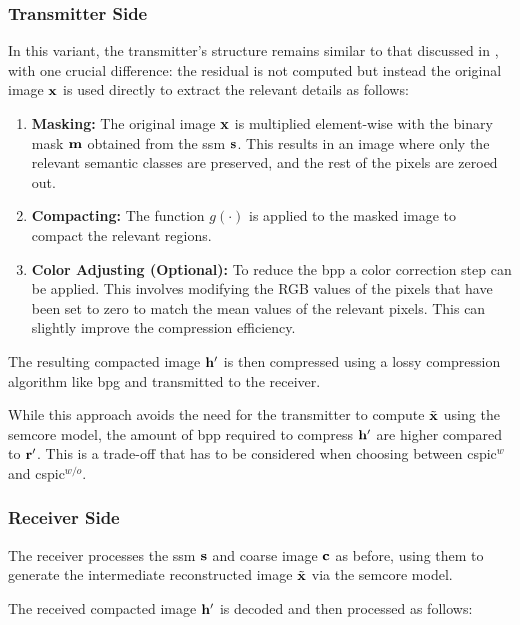 \subsubsection{Transmitter Side}\label{sec: SPIC cspic_no transmitter}

In this variant, the transmitter's structure remains similar to that discussed in , with one crucial difference: the residual is not computed but instead the original image $\mathbf{x}$ is used directly to extract the relevant details as follows:

\begin{enumerate}
    \item \textbf{Masking:} The original image $\mathbf{x}$ is multiplied element-wise with the binary mask $\mathbf{m}$ obtained from the \gls{ssm} $\mathbf{s}$. This results in an image where only the relevant semantic classes are preserved, and the rest of the pixels are zeroed out.

    \item \textbf{Compacting:} The function $g(\cdot)$ is applied to the masked image to compact the relevant regions.

    \item \textbf{Color Adjusting (Optional):} To reduce the \gls{bpp} a color correction step can be applied. This involves modifying the RGB values of the pixels that have been set to zero  to match the mean values of the relevant pixels. This can slightly improve the compression efficiency.
\end{enumerate}

The resulting compacted image $\mathbf{h}'$ is then compressed using a lossy compression algorithm like \gls{bpg} and transmitted to the receiver.

While this approach avoids the need for the transmitter to compute $\tilde{\mathbf{x}}$ using the \gls{semcore} model, the amount of \gls{bpp} required to compress $\mathbf{h}'$ are higher compared to $\mathbf{r}'$. This is a trade-off that has to be considered when choosing between \gls{cspic}$^w$ and \gls{cspic}$^{w/o}$.

\subsubsection{Receiver Side}

The receiver processes the \gls{ssm} $\mathbf{s}$ and coarse image $\mathbf{c}$ as before, using them to generate the intermediate reconstructed image $\tilde{\mathbf{x}}$ via the \gls{semcore} model.

The received compacted image $\mathbf{h}'$ is decoded and then processed as follows:

